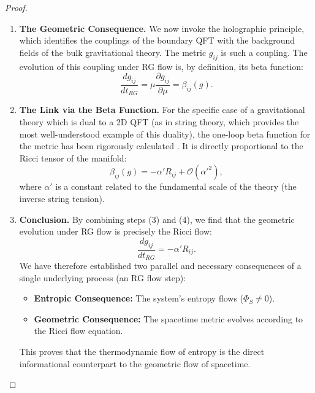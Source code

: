 \documentclass[11pt, letterpaper]{report}
\theoremstyle{plain} %
\theoremstyle{definition} %
\theoremstyle{remark} %
\begin{document}
\begin{proof}
\begin{enumerate}
    \item \textbf{The Geometric Consequence.} We now invoke the holographic principle, which identifies the couplings of the boundary QFT with the background fields of the bulk gravitational theory. The metric $g_{ij}$ is such a coupling. The evolution of this coupling under RG flow is, by definition, its beta function:
    \begin{equation}
        \frac{d g_{ij}}{dt_{RG}} = \mu \frac{\partial g_{ij}}{\partial \mu} = \beta_{ij}(g).
    \end{equation}

    \item \textbf{The Link via the Beta Function.} For the specific case of a gravitational theory which is dual to a 2D QFT (as in string theory, which provides the most well-understood example of this duality), the one-loop beta function for the metric has been rigorously calculated \cite{Callan1985Strings,Friedan1985Nonlinear}. It is directly proportional to the Ricci tensor of the manifold:
    \begin{equation}
        \beta_{ij}(g) = -\alpha' R_{ij} + \mathcal{O}(\alpha'^2),
    \end{equation}
    where $\alpha'$ is a constant related to the fundamental scale of the theory (the inverse string tension).

    \item \textbf{Conclusion.} By combining steps (3) and (4), we find that the geometric evolution under RG flow is precisely the Ricci flow:
    \begin{equation}
        \frac{d g_{ij}}{dt_{RG}} = -\alpha' R_{ij}.
    \end{equation}
    We have therefore established two parallel and necessary consequences of a single underlying process (an RG flow step):
    \begin{itemize}
        \item \textbf{Entropic Consequence:} The system's entropy flows ($\Phi_S \neq 0$).
        \item \textbf{Geometric Consequence:} The spacetime metric evolves according to the Ricci flow equation.
    \end{itemize}
    This proves that the thermodynamic flow of entropy is the direct informational counterpart to the geometric flow of spacetime.
\end{enumerate}
\end{proof}
\end{document}
